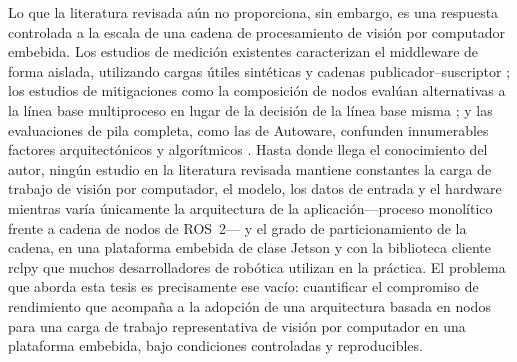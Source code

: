 Lo que la literatura revisada aún no proporciona, sin embargo, es una
respuesta controlada a la escala de una cadena de procesamiento de visión
por computador embebida. Los estudios de medición existentes caracterizan el
middleware de forma aislada, utilizando cargas útiles sintéticas y cadenas
publicador--suscriptor \cite{maruyama2016, kronauer2021, kamiya2025,
luo2025, zhang2024}; los estudios de mitigaciones como la composición de
nodos evalúan alternativas a la línea base multiproceso en lugar de la
decisión de la línea base misma \cite{macenski2023}; y las evaluaciones de
pila completa, como las de Autoware, confunden innumerables factores
arquitectónicos y algorítmicos \cite{betz2023a, betz2024}. Hasta donde llega
el conocimiento del autor, ningún estudio en la literatura revisada mantiene
constantes la carga de trabajo de visión por computador, el modelo, los
datos de entrada y el hardware mientras varía únicamente la arquitectura de
la aplicación---proceso monolítico frente a cadena de nodos de ROS~2--- y el
grado de particionamiento de la cadena, en una plataforma embebida de clase
Jetson y con la biblioteca cliente rclpy que muchos desarrolladores de
robótica utilizan en la práctica.
El problema que aborda esta tesis es precisamente ese vacío: cuantificar el
compromiso de rendimiento que acompaña a la adopción de una arquitectura
basada en nodos para una carga de trabajo representativa de visión por
computador en una plataforma embebida, bajo condiciones controladas y
reproducibles.

